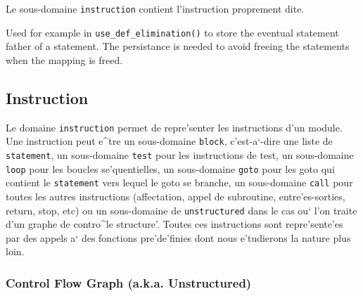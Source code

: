 Le sous-domaine \verb/instruction/ contient
l'instruction proprement dite.

{}

Used for example in \verb/use_def_elimination()/ to store the eventual
statement father of a statement. The persistance is needed to avoid
freeing the statements when the mapping is freed.

\subsection{Instruction}
\label{subsection-instruction}


{ 
Le domaine \verb/instruction/ permet de repre'senter les instructions
d'un module. Une instruction peut e^tre un sous-domaine \verb/block/,
c'est-a`-dire une liste de \verb/statement/, un sous-domaine \verb/test/
pour les instructions de test, un sous-domaine \verb/loop/ pour les
boucles se'quentielles, un sous-domaine \verb/goto/ pour les goto qui
contient le
\verb/statement/ vers lequel le goto se branche, un sous-domaine
\verb/call/ pour toutes les autres instructions (affectation, appel de
subroutine, entre'es-sorties, return, stop, etc) ou un sous-domaine de
\verb/unstructured/ dans le cas ou` l'on traite d'un graphe de contro^le
structure'. Toutes ces instructions 
sont repre'sente'es par des appels a` des fonctions pre'de'finies dont
nous e'tudierons la nature plus loin.
}

\subsubsection{Control Flow Graph (a.k.a. Unstructured)}
\label{subsubsection-unstructured}

